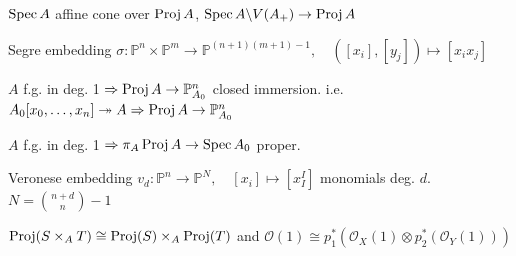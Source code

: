 \begin{definition}
$\operatorname{Spec} A$ affine cone over $\operatorname{Proj} A$, $\operatorname{Spec} A \backslash V(A_+) \to \operatorname{Proj} A$
\end{definition}

\begin{definition} Segre embedding $ \sigma : \mathbb{P}^n \times \mathbb{P}^m \to \mathbb{P}^{(n+1)(m+1) -1}, \quad ([x_i], [y_j]) \mapsto [x_ix_j]$

\end{definition}

\begin{proposition}
$A$ f.g. in deg. 1 $ \Rightarrow \operatorname{Proj} A \to \mathbb{P}^n_{A_0}$ closed immersion. i.e. $A_0[x_0,\ldots, x_n] \twoheadrightarrow A \Rightarrow \operatorname{Proj} A \to \mathbb{P}^n_{A_0}$
\end{proposition}

\begin{proposition}
$A$ f.g. in deg. 1 $ \Rightarrow \pi_A \operatorname{Proj} A \to \operatorname{Spec} A_0$ proper.
\end{proposition}

\begin{definition} Veronese embedding $v_d : \mathbb{P}^n \to \mathbb{P}^N, \quad [x_i] \mapsto [x_I^I]$ monomials deg. $d$. $N=\binom{n+d}{n} - 1$
\end{definition}

\begin{proposition} $\operatorname{Proj} (S \times _A T) \cong \operatorname{Proj} (S)\times _A \operatorname{Proj} (T)$ and $\mathcal{O}(1) \cong p_1^*(\mathcal{O}_X(1) \otimes p_2^*(\mathcal{O}_Y(1) )) $
\end{proposition}